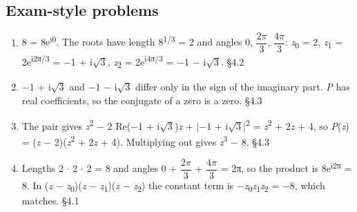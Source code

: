 \documentclass[11pt]{article}
\begin{document}
\begin{keepsection}\subsection{Exam-style problems}

\begin{enumerate}
\item 8 = 8e\textsuperscript{i0}. The roots have length 8\textsuperscript{1/3} = 2 and angles 0, {\small\ensuremath{\dfrac{2π}{3}}}, {\small\ensuremath{\dfrac{4π}{3}}}: \textit{z}\textsubscript{0} = 2, \textit{z}\textsubscript{1} = 2e\textsuperscript{i2π/3} = \ensuremath{-}1 + i\ensuremath{\sqrt{3}}, \textit{z}\textsubscript{2} = 2e\textsuperscript{i4π/3} = \ensuremath{-}1 \ensuremath{-} i\ensuremath{\sqrt{3}}. \hfill{\small\color{FAUblue}§4.2}
\item \ensuremath{-}1 + i\ensuremath{\sqrt{3}} and \ensuremath{-}1 \ensuremath{-} i\ensuremath{\sqrt{3}} differ only in the sign of the imaginary part. \textit{P} has real coefficients, so the conjugate of a zero is a zero. \hfill{\small\color{FAUblue}§4.3}
\item The pair gives \textit{z}\textsuperscript{2} \ensuremath{-} 2 Re(\ensuremath{-}1 + i\ensuremath{\sqrt{3}})\textit{z} + |\ensuremath{-}1 + i\ensuremath{\sqrt{3}}|\textsuperscript{2} = \textit{z}\textsuperscript{2} + 2\textit{z} + 4, so \textit{P}(\textit{z}) = (\textit{z} \ensuremath{-} 2)(\textit{z}\textsuperscript{2} + 2\textit{z} + 4). Multiplying out gives \textit{z}\textsuperscript{3} \ensuremath{-} 8. \hfill{\small\color{FAUblue}§4.3}
\item Lengths 2 \ensuremath{\cdot} 2 \ensuremath{\cdot} 2 = 8 and angles 0 + {\small\ensuremath{\dfrac{2π}{3}}} + {\small\ensuremath{\dfrac{4π}{3}}} = 2π, so the product is 8e\textsuperscript{i2π} = 8. In (\textit{z} \ensuremath{-} \textit{z}\textsubscript{0})(\textit{z} \ensuremath{-} \textit{z}\textsubscript{1})(\textit{z} \ensuremath{-} \textit{z}\textsubscript{2}) the constant term is \ensuremath{-}\textit{z}\textsubscript{0}\textit{z}\textsubscript{1}\textit{z}\textsubscript{2} = \ensuremath{-}8, which matches. \hfill{\small\color{FAUblue}§4.1}
\end{enumerate}

\end{keepsection}
\end{document}
